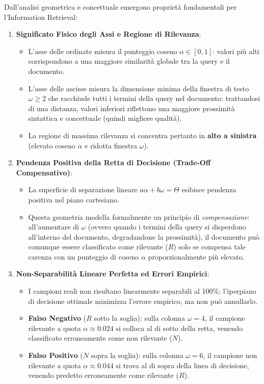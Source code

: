 Dall'analisi geometrica e concettuale emergono propriet\`a fondamentali per l'Information Retrieval:

\begin{enumerate}
    \item \textbf{Significato Fisico degli Assi e Regione di Rilevanza}:
    \begin{itemize}
        \item L'asse delle ordinate misura il punteggio coseno $\alpha \in [0, 1]$: valori pi\`u alti corrispondono a una maggiore similarit\`a globale tra la query e il documento.
        \item L'asse delle ascisse misura la dimensione minima della finestra di testo $\omega \ge 2$ che racchiude tutti i termini della query nel documento: trattandosi di una distanza, valori inferiori riflettono una maggiore prossimit\`a sintattica e concettuale (quindi migliore qualit\`a).
        \item La regione di massima rilevanza si concentra pertanto in \textbf{alto a sinistra} (elevato coseno $\alpha$ e ridotta finestra $\omega$).
    \end{itemize}

    \item \textbf{Pendenza Positiva della Retta di Decisione (Trade-Off Compensativo)}:
    \begin{itemize}
        \item La superficie di separazione lineare $a\alpha + b\omega = \Theta$ esibisce pendenza positiva nel piano cartesiano.
        \item Questa geometria modella formalmente un principio di \emph{compensazione}: all'aumentare di $\omega$ (ovvero quando i termini della query si disperdono all'interno del documento, degradandone la prossimit\`a), il documento pu\`o comunque essere classificato come rilevante ($R$) solo se compensa tale carenza con un punteggio di coseno $\alpha$ proporzionalmente pi\`u elevato.
    \end{itemize}

    \item \textbf{Non-Separabilit\`a Lineare Perfetta ed Errori Empirici}:
    \begin{itemize}
        \item I campioni reali non risultano linearmente separabili al 100\%: l'iperpiano di decisione ottimale minimizza l'errore empirico, ma non pu\`o annullarlo.
        \item \textbf{Falso Negativo} ($R$ sotto la soglia): sulla colonna $\omega = 4$, il campione rilevante a quota $\alpha \approx 0.024$ si colloca al di sotto della retta, venendo classificato erroneamente come non rilevante ($N$).
        \item \textbf{Falso Positivo} ($N$ sopra la soglia): sulla colonna $\omega = 6$, il campione non rilevante a quota $\alpha \approx 0.044$ si trova al di sopra della linea di decisione, venendo predetto erroneamente come rilevante ($R$).
    \end{itemize}
\end{enumerate}

